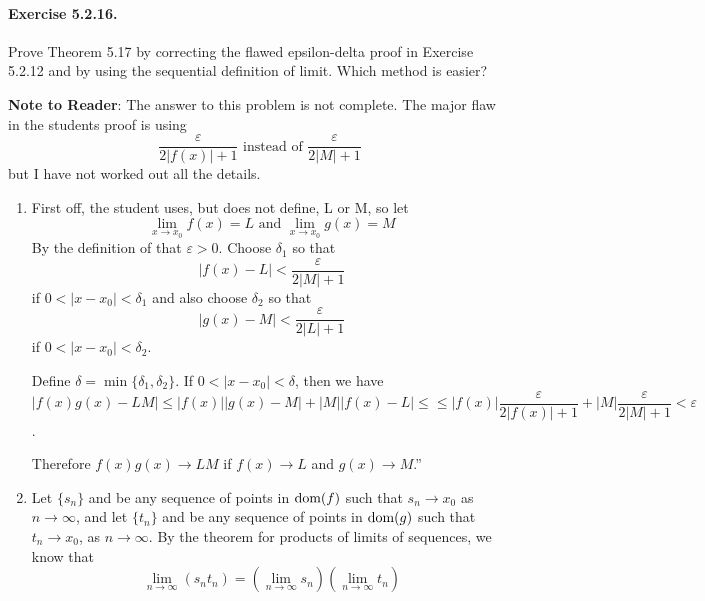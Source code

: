 \documentclass[11pt]{article}
\def \epsilon {\varepsilon}
\newcommand{\set}[1]{\{#1\}}
\def \limittoinfyn {\lim_{n \to \infty}}
\def \limitToXZero {\lim_{x \to x_0}}
\def \sn {s_n}
\def \tn {t_n}
\begin{document}
\paragraph{Exercise 5.2.16.} Prove Theorem 5.17 by correcting the flawed epsilon-delta proof in Exercise 5.2.12 and by using the sequential definition of limit.
Which method is easier?

\textbf{Note to Reader}: The answer to this problem is not complete. The major flaw in the students proof is using 
	$$ \frac{\epsilon}{2|f(x)| + 1} \text{ instead of } \frac{\epsilon}{2|M| + 1} $$ but I have not worked out all the details. 

\begin{enumerate} 
	\item First off, the student uses, but does not define, L or M, so let 
		$$ \limitToXZero f(x) = L \text{ and } \limitToXZero g(x) = M$$
	By the definition of that $ \epsilon > 0 $.
	Choose $ \delta_1 $ so that
		$$ |f(x) - L| <\frac{\epsilon}{2|M| + 1} $$
	if $ 0 < |x - x_0| < \delta_1 $ and also choose $ \delta_2 $ so that 
		$$ |g(x) - M| < \frac{\epsilon}{2|L| + 1} $$ 
	if $ 0 < |x - x_0| < \delta_2 $. 
	
	Define $ \delta = \min \set{\delta_1, \delta_2} $. If $ 0 < |x - x_0| < \delta $, then we have 
	$$ |f(x)g(x) - LM| \leq |f(x)| |g(x) - M| + |M| |f(x) - L| \leq≤ |f(x)| \frac{\epsilon}{2|f(x)| + 1} + |M| \frac{\epsilon}{2|M| + 1} < \epsilon $$. 
	
	Therefore $ f(x)g(x) \to LM $ if $ f(x) \to L $ and $ g(x) \to M $.”
	
	\item 
	Let $ \set{\sn}$ and be any sequence of points in $ \text{dom}(f) $ such that $ \sn \to x_0 $ as $ n \to \infty $, and let $ \set{\tn}$ and be any sequence of points in $ \text{dom}(g) $ such that $ \tn \to x_0 $, as $ n \to \infty $. By the theorem for products of limits of sequences, we know that $$ \limittoinfyn (\sn\tn)  = \left(\limittoinfyn \sn \right) \left(\limittoinfyn \tn \right)$$
\end{enumerate}
\end{document}
